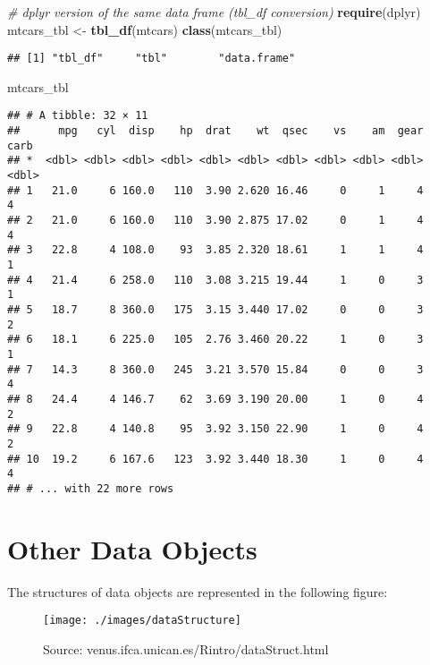 \documentclass[]{book}
\newenvironment{Shaded}{\begin{snugshade}}{\end{snugshade}}
\newcommand{\KeywordTok}[1]{\textcolor[rgb]{0.13,0.29,0.53}{\textbf{{#1}}}}
\newcommand{\StringTok}[1]{\textcolor[rgb]{0.31,0.60,0.02}{{#1}}}
\newcommand{\CommentTok}[1]{\textcolor[rgb]{0.56,0.35,0.01}{\textit{{#1}}}}
\newcommand{\NormalTok}[1]{{#1}}
\begin{document}
\begin{Shaded}
\begin{Highlighting}[]
\CommentTok{# dplyr version of the same data frame (tbl_df conversion)}
\KeywordTok{require}\NormalTok{(dplyr)}
\NormalTok{mtcars_tbl <-}\StringTok{ }\KeywordTok{tbl_df}\NormalTok{(mtcars)}
\KeywordTok{class}\NormalTok{(mtcars_tbl)}
\end{Highlighting}
\end{Shaded}

\begin{verbatim}
## [1] "tbl_df"     "tbl"        "data.frame"
\end{verbatim}

\begin{Shaded}
\begin{Highlighting}[]
\NormalTok{mtcars_tbl}
\end{Highlighting}
\end{Shaded}

\begin{verbatim}
## # A tibble: 32 × 11
##      mpg   cyl  disp    hp  drat    wt  qsec    vs    am  gear  carb
## *  <dbl> <dbl> <dbl> <dbl> <dbl> <dbl> <dbl> <dbl> <dbl> <dbl> <dbl>
## 1   21.0     6 160.0   110  3.90 2.620 16.46     0     1     4     4
## 2   21.0     6 160.0   110  3.90 2.875 17.02     0     1     4     4
## 3   22.8     4 108.0    93  3.85 2.320 18.61     1     1     4     1
## 4   21.4     6 258.0   110  3.08 3.215 19.44     1     0     3     1
## 5   18.7     8 360.0   175  3.15 3.440 17.02     0     0     3     2
## 6   18.1     6 225.0   105  2.76 3.460 20.22     1     0     3     1
## 7   14.3     8 360.0   245  3.21 3.570 15.84     0     0     3     4
## 8   24.4     4 146.7    62  3.69 3.190 20.00     1     0     4     2
## 9   22.8     4 140.8    95  3.92 3.150 22.90     1     0     4     2
## 10  19.2     6 167.6   123  3.92 3.440 18.30     1     0     4     4
## # ... with 22 more rows
\end{verbatim}

\section{Other Data Objects}\label{other-data-objects}

The structures of data objects are represented in the following figure:

\begin{figure}
\texttt{[image: ./images/dataStructure]} \caption{Source:  venus.ifca.unican.es/Rintro/dataStruct.html}\label{fig:g1}
\end{figure}
\end{document}

